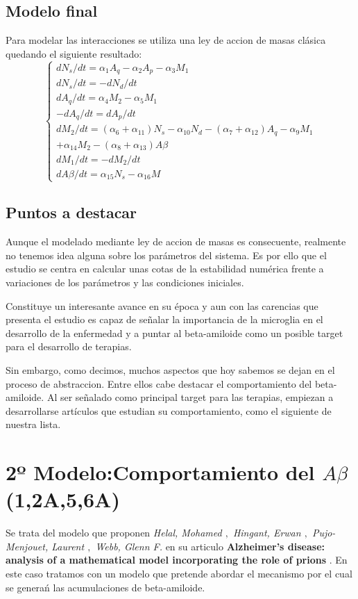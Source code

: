 \documentclass[1p]{elsarticle}
\begin{document}
\subsection{Modelo final}
Para modelar las interacciones se utiliza una ley de accion de masas clásica quedando el siguiente resultado:
\begin{equation}
\left\lbrace
\begin{array}{ll}
dN_s/dt=\alpha_1A_q-\alpha_2A_p-\alpha_3M_1 \\
dN_s/dt=-dN_d/dt\\
dA_q/dt=\alpha_4M_2-\alpha_5M_1 \\
-dA_q/dt=dA_p/dt \\
dM_2/dt=(\alpha_6+\alpha_{11})N_s-\alpha_{10}N_d-(\alpha_7+\alpha_{12})A_q-\alpha_9M_1\\+\alpha_{14}M_2-(\alpha_8+\alpha_{13})A\beta\\
dM_1/dt=-dM_2/dt \\
dA\beta/dt=\alpha_{15}N_s-\alpha_{16}M
\end{array}
\right.
\end{equation}

\subsection{Puntos a destacar}
Aunque el modelado mediante ley de accion de masas es consecuente, realmente no tenemos idea alguna sobre los parámetros del sistema. Es por ello que el estudio se centra en calcular unas cotas de la estabilidad numérica frente a variaciones de los parámetros y las condiciones iniciales. 

Constituye un interesante avance en su época y aun con las carencias que presenta el estudio es capaz de señalar la importancia de la microglia en el desarrollo de la enfermedad y a puntar al beta-amiloide como un posible target para el desarrollo de terapias.

Sin embargo, como decimos, muchos aspectos que hoy sabemos se dejan en el proceso de abstraccion. Entre ellos cabe destacar el comportamiento del beta-amiloide. Al ser señalado como principal target para las terapias, empiezan a desarrollarse artículos que estudian su comportamiento, como el siguiente de nuestra lista.






\section{2º Modelo:Comportamiento del $A\beta$ (1,2A,5,6A)}
Se trata del modelo que proponen \textit{Helal, Mohamed $,$ Hingant, Erwan $,$ Pujo-Menjouet, Laurent $,$ Webb, Glenn F.} en su articulo \textbf{Alzheimer’s disease: analysis of a mathematical model incorporating the role of prions} \cite{helal}. En este caso tratamos con un modelo que pretende abordar el mecanismo por el cual se generań las acumulaciones de beta-amiloide.
\end{document}

